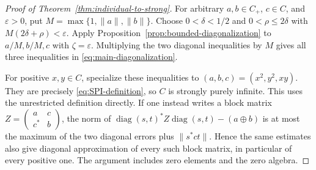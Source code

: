 \begin{proof}[Proof of Theorem~\ref{thm:individual-to-strong}]
For arbitrary \(a,b\in C_+\), \(c\in C\), and
\(\varepsilon>0\), put \(M=\max\{1,\|a\|,\|b\|\}\).
Choose \(0<\delta<1/2\) and \(0<\rho\le2\delta\)
with \(M(2\delta+\rho)<\varepsilon\).  Apply
Proposition~\ref{prop:bounded-diagonalization} to \(a/M,b/M,c\)
with \(\zeta=\varepsilon\).  Multiplying the two diagonal
inequalities by \(M\) gives all three inequalities in
\eqref{eq:main-diagonalization}.

For positive \(x,y\in C\), specialize these inequalities to
\((a,b,c)=(x^2,y^2,xy)\).  They are precisely
\eqref{eq:SPI-definition}, so \(C\) is strongly purely infinite.
This uses the unrestricted definition directly.  If one instead
writes a block matrix
\(Z=\left(\begin{smallmatrix}a&c\\c^*&b\end{smallmatrix}\right)\),
the norm of
\(\operatorname{diag}(s,t)^*Z\operatorname{diag}(s,t)-(a\oplus b)\)
is at most the maximum of the two diagonal errors plus
\(\|s^*ct\|\).  Hence the same estimates also give diagonal
approximation of every such block matrix, in particular of every
positive one.  The argument includes zero elements and the zero
algebra.
\end{proof}
